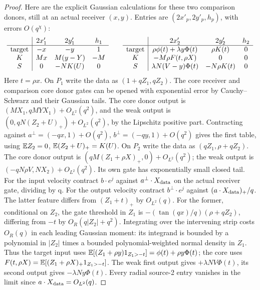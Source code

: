\documentclass[11pt]{article}
\begin{document}
\begin{proof}
Here are the explicit Gaussian calculations for these two comparison
donors, still at an actual receiver \((x,y)\). Entries are
\((2x'_p,2y'_p,h_p)\), with errors \(O(q^\chi)\):
\[
\begin{array}{c|ccc}
 &2x'_1&2y'_1&h_1\\ \hline
{\rm target}&-x&-y&1\\
K&Mx&M(y-Y)&-M\\
S&0&-NK(U)&0
\end{array}
\qquad
\begin{array}{c|ccc}
 &2x'_2&2y'_2&h_2\\ \hline
{\rm target}&\rho\phi(t)+\lambda y\Phi(t)&\rho K(t)&0\\
K&-M\rho F(t,\rho X)&0&0\\
S&\lambda N(V-y)\Phi(t)&-N\rho K(t)&0
\end{array}
\]
Here \(t=\rho x\). On \(P_1\) write the data as \((1+qZ_1,qZ_2)\).
The core receiver and comparison core donor gates can be opened with
exponential error by Cauchy--Schwarz and their Gaussian tails. The core
donor output is \((MX_1,qMYX_1)+O_{L^2}(q^2)\), and the weak output is
\((0,qN(Z_2+U)_+)+O_{L^2}(q^2)\), by the Lipschitz positive part.
Contracting against \(a^\perp=(-qx,1)+O(q^2)\),
\(b^\perp=(-qy,1)+O(q^2)\) gives the first table, using
\(\mathbb E Z_2=0\), \(\mathbb E(Z_2+U)_+=K(U)\).
On \(P_2\) write the data as \((qZ_1,\rho+qZ_2)\).
The core donor output is \((qM(Z_1+\rho X)_+,0)+O_{L^2}(q^2)\);
the weak output is \((-qN\rho V,NX_2)+O_{L^2}(q^2)\).
Its own gate has exponentially small closed tail. For the input
velocity contract \(b\cdot e^j\) against \(a^\perp\cdot X_{\rm data}\)
on the actual receiver gate, dividing by q. For the output velocity
contract \(b^\perp\cdot e^j\) against \((a\cdot X_{\rm data})_+/q\).
The latter feature differs from \((Z_1+t)_+\) by \(O_{L^2}(q)\).
For the former, conditional on \(Z_2\), the gate threshold in \(Z_1\)
is \(-(\tan(qx)/q)(\rho+qZ_2)\), differing from \(-t\) by
\(O_R(q|Z_2|+q^2)\). Integrating over the intervening strip costs
\(O_R(q)\) in each leading Gaussian moment: its integrand is bounded
by a polynomial in \(|Z_2|\) times a bounded polynomial-weighted
normal density in \(Z_1\). Thus the target input uses
\(\mathbb E[(Z_1+\rho y)1_{Z_1>-t}]=\phi(t)+\rho y\Phi(t)\);
the core uses \(F(t,\rho X)=\mathbb E[(Z_1+\rho X)_+1_{Z_1>-t}]\).
The weak first output gives \(+\lambda NV\Phi(t)\), its second output
gives \(-\lambda Ny\Phi(t)\). Every radial source-2 entry vanishes
in the limit since \(a\cdot X_{\rm data}=O_{L^2}(q)\).


\end{proof}
\end{document}
